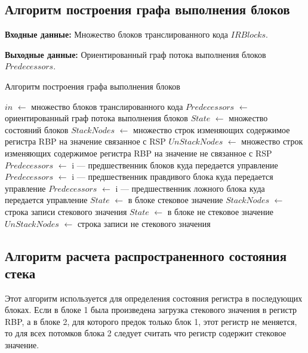 \subsection{Алгоритм построения графа выполнения блоков}

\textbf{Входные данные:} Множество блоков транслированного кода $IRBlocks$.

\textbf{Выходные данные:} Ориентированный граф потока выполнения блоков $Predecessors$.

\begin{algorithm}[H]
\small
	\caption{Алгоритм построения графа выполнения блоков}
	\label{alg:graph}
	\begin{algorithmic}[1]
		\State $in$ $\gets$ множество блоков транслированного кода
		\State $Predecessors$ $\gets$ ориентированный граф потока выполнения блоков
		\State $State$ $\gets$ множество состояний блоков
		\State $StackNodes$ $\gets$ множество строк изменяющих содержимое регистра RBP на значение связанное с RSP
		\State $UnStackNodes$ $\gets$ множество строк изменяющих содержимое регистра RBP на значение не связанное с RSP
		\State $Predecessors$ $\gets$ i --- предшественник блоков куда передается управление
		\EndIf
		\State $Predecessors$ $\gets$ i --- предшественник правдивого блока куда передается управление
		\State $Predecessors$ $\gets$ i --- предшественник ложного блока куда передается управление
		\EndIf
		\State $State$ $\gets$ в блоке стековое значение
		\State $StackNodes$ $\gets$ строка записи стекового значения
		\Else
		\State $State$ $\gets$ в блоке не стековое значение
		\State $UnStackNodes$ $\gets$ строка записи не стекового значения
		\EndIf
		\EndIf
		\EndFor
		\EndFor
	\end{algorithmic}
\end{algorithm}

\subsection{Алгоритм расчета распространенного состояния стека}

Этот алгоритм используется для определения состояния регистра в последующих блоках. Если в блоке 1 была произведена загрузка стекового значения в регистр RBP, а в блоке 2, для которого предок только блок 1, этот регистр не меняется, то для всех потомков блока 2 следует считать что регистр содержит стековое значение.

